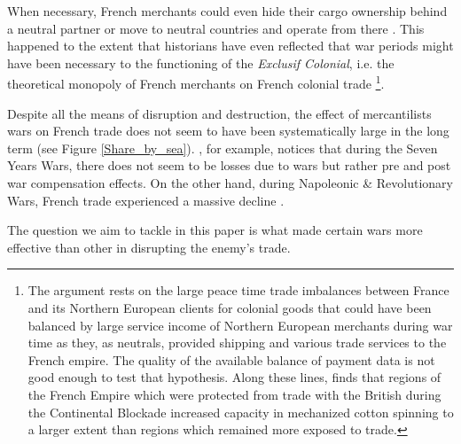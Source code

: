 \documentclass[12pt,a4paper,notitlepage,english]{article}
\begin{document}
When necessary, French merchants could even hide their cargo ownership behind a neutral partner 
or move to neutral countries and operate from there \citep{Marzagalli2016}. This happened to the extent that historians have even reflected that war periods might have been necessary to the functioning of the \textit{Exclusif Colonial}, i.e. the theoretical monopoly of French merchants on French colonial trade \citep{Lespagnol1997, Morineau1997, Marzagalli2016}\footnote{
The argument rests on the large peace time trade imbalances between France and its Northern European clients for colonial goods that could have been balanced by large service income of Northern European merchants during war time as they, as neutrals, provided shipping and various trade services to the French empire. The quality of the available balance of payment data is not good enough to test that hypothesis. Along these lines, \cite{Juhasz2018} finds that regions of the French Empire which were protected from trade with the British during the Continental Blockade increased capacity in mechanized cotton spinning to a larger extent than regions which remained more exposed to trade.}.

Despite all the means of disruption and destruction, the effect of mercantilists wars on French trade does not seem to have been systematically large in the long term (see Figure  \ref{Share_by_sea}).
\cite{Riley1986}, for example, notices that during the Seven Years Wars, there does not seem to be losses due to wars but rather pre and post war compensation effects. On the other hand, during Napoleonic \& Revolutionary Wars, French trade experienced a massive decline \citep{Findlay2009}.

The question we aim to tackle in this paper is what made certain wars more effective than other in disrupting the enemy's trade. 
\end{document}
